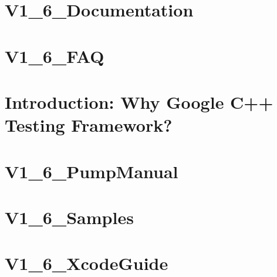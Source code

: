 \documentclass[twoside]{book}
\newcommand{\+}{\discretionary{\mbox{\scriptsize$\hookleftarrow$}}{}{}}
\begin{document}
\chapter{V1\+\_\+6\+\_\+\+Documentation}
\label{md__home_bhargavi_Documents_SDR_Copy_Exam_808X_vendor_googletest_googletest_docs_V1_6_Documentation}
\hypertarget{md__home_bhargavi_Documents_SDR_Copy_Exam_808X_vendor_googletest_googletest_docs_V1_6_Documentation}{}

\chapter{V1\+\_\+6\+\_\+\+F\+AQ}
\label{md__home_bhargavi_Documents_SDR_Copy_Exam_808X_vendor_googletest_googletest_docs_V1_6_FAQ}
\hypertarget{md__home_bhargavi_Documents_SDR_Copy_Exam_808X_vendor_googletest_googletest_docs_V1_6_FAQ}{}

\chapter{Introduction\+: Why Google C++ Testing Framework?}
\label{md__home_bhargavi_Documents_SDR_Copy_Exam_808X_vendor_googletest_googletest_docs_V1_6_Primer}
\hypertarget{md__home_bhargavi_Documents_SDR_Copy_Exam_808X_vendor_googletest_googletest_docs_V1_6_Primer}{}

\chapter{V1\+\_\+6\+\_\+\+Pump\+Manual}
\label{md__home_bhargavi_Documents_SDR_Copy_Exam_808X_vendor_googletest_googletest_docs_V1_6_PumpManual}
\hypertarget{md__home_bhargavi_Documents_SDR_Copy_Exam_808X_vendor_googletest_googletest_docs_V1_6_PumpManual}{}

\chapter{V1\+\_\+6\+\_\+\+Samples}
\label{md__home_bhargavi_Documents_SDR_Copy_Exam_808X_vendor_googletest_googletest_docs_V1_6_Samples}
\hypertarget{md__home_bhargavi_Documents_SDR_Copy_Exam_808X_vendor_googletest_googletest_docs_V1_6_Samples}{}

\chapter{V1\+\_\+6\+\_\+\+Xcode\+Guide}
\label{md__home_bhargavi_Documents_SDR_Copy_Exam_808X_vendor_googletest_googletest_docs_V1_6_XcodeGuide}
\hypertarget{md__home_bhargavi_Documents_SDR_Copy_Exam_808X_vendor_googletest_googletest_docs_V1_6_XcodeGuide}{}

\end{document}
